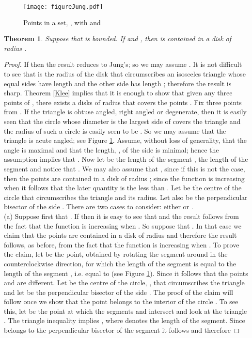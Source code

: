 \documentclass[12pt]{article}
\newtheorem{thm}{Theorem}[section]
\begin{document}
\begin{figure}[htbp]
   \centering
   \texttt{[image: figureJung.pdf]} \caption{\small{Points  in a set, , with  and }}
   \label{fig:example}
\end{figure}


\begin{thm}\label{jung} Suppose that  is bounded. 
If  and ,
then  is contained in a disk of radius 
.
\end{thm}
\begin{proof} If  then the result reduces to Jung's; so we may assume .
It is not difficult to see that  is the radius of the disk that 
circumscribes an isosceles triangle whose equal sides have length  and the other side 
has length ; therefore the result is sharp. Theorem \ref{Klee} implies that it is enough to
show that given any three points   of , there exists a disks of 
radius  that covers the points . Fix three points  from .
If the triangle  is obtuse angled, right angled or 
degenerate, then it is easily seen that 
the circle whose diameter is the largest side of  covers the triangle and 
the radius of such a circle is easily seen to be . So we may assume that the 
triangle  is acute angled;
see Figure \ref{fig:example}. Assume, without loss of generality, that the angle  is maximal 
and that the length, , of the side  is minimal; hence the assumption 
implies that .
Now let  be the length of the segment ,  
the length of the segment  and notice that . 
We may also assume that , since if this is not the case, then  
the points  
are contained in a disk of radius 
;
since  the function  is 
increasing when  it follows that the later quantity is the less than .
Let  be the centre of the circle that circumscribes the triangle 
and  its radius.
Let also  be the perpendicular bisector of the side . 
There are two cases to consider: either  or . \\
(a) Suppose first that .
If  then it is easy to see that 
  and 
the result follows from the fact that the function  is 
increasing when . So suppose that . 
In that case we claim that the points  are 
contained in a disk of radius   
and therefore the result follows, as before, from the fact that the function  is increasing when . 
To prove the claim, let  be the point, obtained by rotating the segment  around 
in the counterclockwise direction, for which  
the length of the segment  is equal to the length of the segment 
, i.e. equal to  (see Figure \ref{fig:example}). Since 
 it follows that the points  and  are different. 
Let  be the centre of the circle, , 
that circumscribes the triangle  and 
let  
be the perpendicular bisector of the side .  
The proof of the claim will follow once we show that the 
point  belongs to the interior of the circle . To see this, let  be the point at which the 
segments  and  intersect and look at the triangle . The triangle 
inequality implies , where 
 denotes the length of the segment. Since  belongs to the perpendicular bisector 
of the segment  it follows  and therefore 


\end{proof}
\end{document}

